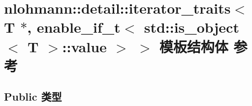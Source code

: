 \hypertarget{structnlohmann_1_1detail_1_1iterator__traits_3_01_t_01_5_00_01enable__if__t_3_01std_1_1is__objec8d960665487688165530972cda4f1bea}{}\section{nlohmann\+::detail\+::iterator\+\_\+traits$<$ T $\ast$, enable\+\_\+if\+\_\+t$<$ std\+::is\+\_\+object$<$ T $>$\+::value $>$ $>$ 模板结构体 参考}
\label{structnlohmann_1_1detail_1_1iterator__traits_3_01_t_01_5_00_01enable__if__t_3_01std_1_1is__objec8d960665487688165530972cda4f1bea}
\subsection*{Public 类型}
